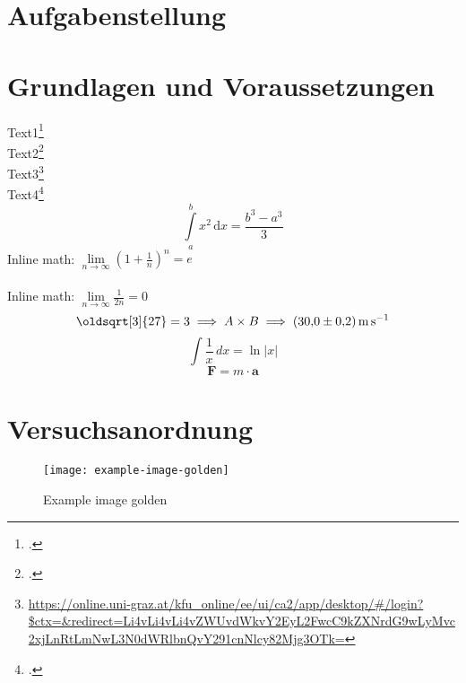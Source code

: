 \documentclass[ngerman]{scrartcl}
\renewcommand*{\sqrt}[2][\ ]{\oldsqrt[#1]{#2} }
\begin{document}


\clearpage
\tableofcontents
\newpage

\section{Aufgabenstellung}
\label{sec:aufgabenstellung}



\section{Grundlagen und Voraussetzungen}
\label{sec:grundlagen_voraussetzungen}

Text1\footcite[1000]{ref:dem1} \\
Text2\footcite[Kapitel 74]{ref:knoll} \\
Text3\footnote{\url{https://online.uni-graz.at/kfu_online/ee/ui/ca2/app/desktop/\#/login?$ctx=&redirect=Li4vLi4vLi4vZWUvdWkvY2EyL2FwcC9kZXNrdG9wLyMvc2xjLnRtLmNwL3N0dWRlbnQvY291cnNlcy82Mjg3OTk=}} \\  %
Text4\footcite{ref:genol2013}
%
\begin{equation}
    \label{eq:grenzen-oben-unten}
    \int \limits_{a}^{b} x^2 \, \mathrm{d}x =\frac{b^3-a^3}{3}  %
\end{equation}
%
Inline math: \(\lim \limits_{n \to \infty} \left( 1 + \frac{1}{n} \right) ^{n} = e\)  \\ \\ %
Inline math: $\lim \limits_{n \to \infty} \frac{1}{2n} = 0$  %
%
\begin{displaymath}
    \sqrt[3]{27} = 3 \implies A \times B \implies \SI{30.0(2)}{\meter\per\second}
\end{displaymath}
%
\[ \int \frac{1}{x} \, dx = \ln|x| \]  %
$$ \textbf{F} = m \cdot \textbf{a} $$  %



\section{Versuchsanordnung}
\label{sec:versuchsanordnung}

\begin{figure}[H]
    \centering
    \begin{samepage}
        \texttt{[image: example-image-golden]}
        \caption{Example image golden}
        \label{fig:example-image-golden}
    \end{samepage}
\end{figure}
\end{document}
